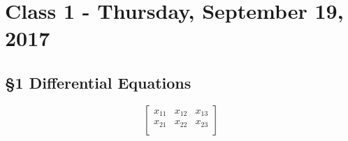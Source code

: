 \chapter{Class 1 - Thursday, September 19, 2017}
\section{\S 1 Differential Equations}


$$
\begin{bmatrix}
    x_{11}       & x_{12} & x_{13} \\
    x_{21}       & x_{22} & x_{23} \\
\end{bmatrix}
$$